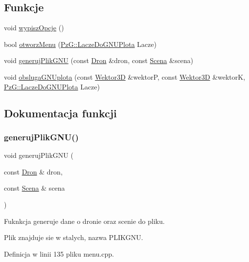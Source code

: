 \subsection*{Funkcje}
\begin{DoxyCompactItemize}
\item 
void \mbox{\hyperlink{menu_8hh_a94d72e7cfca9043780b1dda5a01e9632}{wypisz\+Opcje}} ()
\item 
bool \mbox{\hyperlink{menu_8hh_a32a0a14b80567d267e3e6d831c2a517b}{otworz\+Menu}} (\mbox{\hyperlink{class_pz_g_1_1_lacze_do_g_n_u_plota}{Pz\+G\+::\+Lacze\+Do\+G\+N\+U\+Plota}} Lacze)
\item 
void \mbox{\hyperlink{menu_8hh_a924b8ff013a18f0f1f0fdbdda6538e07}{generuj\+Plik\+G\+NU}} (const \mbox{\hyperlink{class_dron}{Dron}} \&dron, const \mbox{\hyperlink{class_scena}{Scena}} \&scena)
\item 
void \mbox{\hyperlink{menu_8hh_a233cd71579a56ad0b2926d4c5217eaa1}{obsluga\+G\+N\+Uplota}} (const \mbox{\hyperlink{class_wektor3_d}{Wektor3D}} \&wektorP, const \mbox{\hyperlink{class_wektor3_d}{Wektor3D}} \&wektorK, \mbox{\hyperlink{class_pz_g_1_1_lacze_do_g_n_u_plota}{Pz\+G\+::\+Lacze\+Do\+G\+N\+U\+Plota}} Lacze)
\end{DoxyCompactItemize}


\subsection{Dokumentacja funkcji}
\mbox{\label{menu_8hh_a924b8ff013a18f0f1f0fdbdda6538e07}} 
\subsubsection{\texorpdfstring{generujPlikGNU()}{generujPlikGNU()}}
{\footnotesize\ttfamily void generuj\+Plik\+G\+NU (\begin{DoxyParamCaption}\item[{const \mbox{\hyperlink{class_dron}{Dron}} \&}]{dron,  }\item[{const \mbox{\hyperlink{class_scena}{Scena}} \&}]{scena }\end{DoxyParamCaption})}

Fuknkcja generuje dane o dronie oraz scenie do pliku.

Plik znajduje sie w stalych, nazwa P\+L\+I\+K\+G\+NU. 

Definicja w linii 135 pliku menu.\+cpp.

